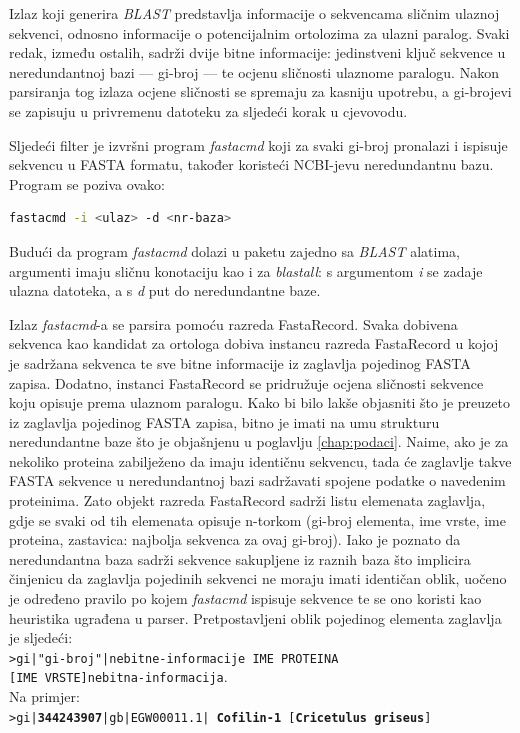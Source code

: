 Izlaz koji generira \emph{BLAST} predstavlja informacije o sekvencama sličnim
ulaznoj sekvenci, odnosno informacije o potencijalnim ortolozima za ulazni
paralog. Svaki redak, između ostalih, sadrži dvije bitne informacije:
jedinstveni ključ sekvence u neredundantnoj bazi --- gi-broj --- te ocjenu
sličnosti ulaznome paralogu. Nakon parsiranja tog izlaza ocjene sličnosti se
spremaju za kasniju upotrebu, a gi-brojevi se zapisuju u privremenu datoteku za
sljedeći korak u cjevovodu.

Sljedeći filter je izvršni program \emph{fastacmd} koji za svaki gi-broj pronalazi
i ispisuje sekvencu u FASTA formatu, također koristeći NCBI-jevu neredundantnu
bazu. Program se poziva ovako:

\begin{lstlisting}[language=bash]
fastacmd -i <ulaz> -d <nr-baza>
\end{lstlisting}

Budući da program \emph{fastacmd} dolazi u paketu zajedno sa \emph{BLAST}
alatima, argumenti imaju sličnu konotaciju kao i za \emph{blastall}: s
argumentom \emph{i} se zadaje ulazna datoteka, a s \emph{d} put do neredundantne
baze.

Izlaz \emph{fastacmd}-a se parsira pomoću razreda FastaRecord. Svaka dobivena
sekvenca kao kandidat za ortologa dobiva instancu razreda FastaRecord u kojoj je
sadržana sekvenca te sve bitne informacije iz zaglavlja pojedinog FASTA zapisa.
Dodatno, instanci FastaRecord se pridružuje ocjena sličnosti sekvence koju
opisuje prema ulaznom paralogu. Kako bi bilo lakše objasniti što je preuzeto iz
zaglavlja pojedinog FASTA zapisa, bitno je imati na umu strukturu neredundantne
baze što je objašnjenu u poglavlju \ref{chap:podaci}. Naime, ako je za nekoliko
proteina zabilježeno da imaju identičnu sekvencu, tada će zaglavlje takve FASTA
sekvence u neredundantnoj bazi sadržavati spojene podatke o navedenim
proteinima. 
Zato objekt razreda FastaRecord sadrži listu elemenata zaglavlja,
gdje se svaki od tih elemenata opisuje n-torkom (gi-broj elementa, ime vrste, ime
proteina, zastavica: najbolja sekvenca za ovaj gi-broj). Iako je poznato
da neredundantna baza sadrži sekvence sakupljene iz raznih baza što implicira
činjenicu da zaglavlja pojedinih sekvenci ne moraju imati identičan oblik,
uočeno je određeno pravilo po kojem \emph{fastacmd} ispisuje sekvence te se ono
koristi kao heuristika ugrađena u parser. Pretpostavljeni oblik pojedinog
elementa zaglavlja je sljedeći:\\
\texttt{>gi|"gi-broj"|nebitne-informacije IME PROTEINA}\\
\texttt{[IME VRSTE]nebitna-informacija}.\\
Na primjer:\\
\texttt{>gi|\textbf{344243907}|gb|EGW00011.1| \textbf{Cofilin-1}
[\textbf{Cricetulus griseus}]}\\

